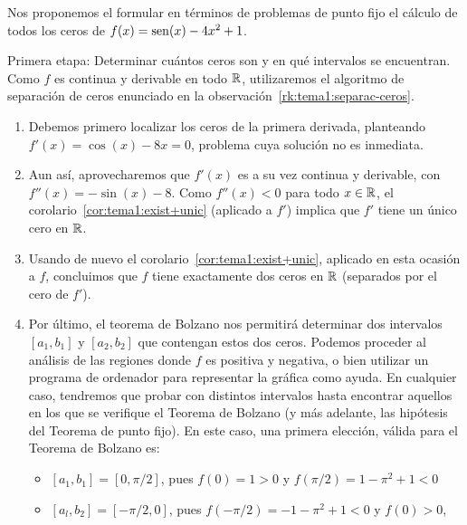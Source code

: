 \begin{example}
  Nos proponemos el formular en términos de problemas de punto fijo el
  cálculo de todos los ceros de $f(x)=\operatorname{sen}(x)-4x^2+1$.


  \textsf{Primera etapa:} Determinar cuántos ceros son y en qué
  intervalos se encuentran. Como $f$ es continua y derivable en todo
  $\operatorname{{\mathbb R}}$, utilizaremos el algoritmo de separación de ceros enunciado
  en la observación~\ref{rk:tema1:separac-ceros}.
  \begin{enumerate}
  \item Debemos primero localizar los ceros de la primera
    derivada, planteando $f'(x)=\cos(x)-8x=0$, problema cuya solución
    no es inmediata.
  \item Aun así, aprovecharemos que $f'(x)$ es a su vez continua y
    derivable, con $f''(x)=-\sin(x)-8$. Como $f''(x)<0$ para todo
    $x\in\operatorname{{\mathbb R}}$, el corolario~\ref{cor:tema1:exist+unic} (aplicado a
    $f'$) implica que $f'$ tiene un único cero en $\operatorname{{\mathbb R}}$.
  \item Usando de nuevo el
    corolario~\ref{cor:tema1:exist+unic}, aplicado en esta ocasión a
    $f$, concluimos que $f$ tiene exactamente dos ceros en $\operatorname{{\mathbb R}}$
    (separados por el cero de $f'$).
  \item Por último, el teorema de Bolzano nos permitirá determinar dos
    intervalos $[a_1,b_1]$ y $[a_2,b_2]$ que contengan estos dos
    ceros. Podemos proceder al análisis de las regiones donde $f$ es
    positiva y negativa, o bien utilizar un programa de ordenador para
    representar la gráfica como ayuda. En cualquier caso, tendremos
    que probar con distintos intervalos hasta encontrar aquellos en
    los que se verifique el Teorema de Bolzano (y más adelante, las
    hipótesis del Teorema de punto fijo). En este caso, una primera
    elección, válida para el Teorema de Bolzano es:
    \begin{itemize}
    \item $[a_1,b_1]=[0, \pi/2]$, pues $f(0)=1>0$ y $f(\pi/2)= 1-\pi^2+1<0$
    \item $[a_l,b_2]=[-\pi/2, 0]$, pues $f(-\pi/2)=-1-\pi^2+1<0$ y
      $f(0)>0$,
    \end{itemize}
  \end{enumerate}


\end{example}
